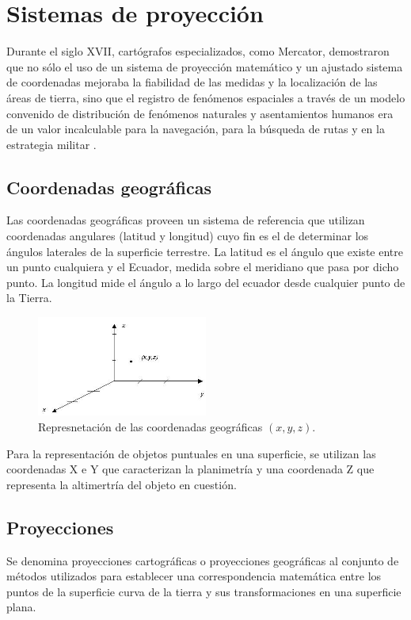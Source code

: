 \section{Sistemas de proyección}
\label{sec:cap2-sistemas-de-proyeccion}
Durante el siglo XVII, cartógrafos especializados, como Mercator, demostraron que no sólo el uso de
un sistema de proyección matemático y un ajustado sistema de coordenadas mejoraba la fiabilidad de
las medidas y la localización de las áreas de tierra, sino que el registro de fenómenos espaciales
a través de un modelo convenido de distribución de fenómenos naturales y asentamientos humanos era
de un valor incalculable para la navegación, para la búsqueda de rutas y en la estrategia militar
\citep{llopis2006sistemas}.

\subsection{Coordenadas geográficas}
Las coordenadas geográficas proveen un sistema de referencia que utilizan coordenadas angulares
(latitud y longitud) cuyo fin es el de determinar los ángulos laterales de la superficie terrestre.
La latitud es el ángulo que existe entre un punto cualquiera y el Ecuador, medida sobre el
meridiano que pasa por dicho punto. La longitud mide el ángulo a lo largo del ecuador desde
cualquier punto de la Tierra.

\begin{figure}
\centering
\includegraphics[width=0.5\textwidth]{capitulo-2/graphics/coordenadas-xyz.jpg}
\caption{\label{fig:sig-xyz} Represnetación de las coordenadas geográficas $(x,y,z)$.}
\end{figure}

Para la representación de objetos puntuales en una superficie, se utilizan las coordenadas X e Y
que caracterizan la planimetría y una coordenada Z que representa la altimertría del objeto en
cuestión.

\subsection{Proyecciones}
Se denomina proyecciones cartográficas o proyecciones geográficas al conjunto de métodos
utilizados para establecer una correspondencia matemática entre los puntos de la superficie curva
de la tierra y sus transformaciones en una superficie plana.

